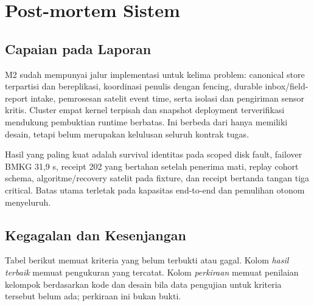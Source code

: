 \chapter{Post-mortem Sistem}
\section{Capaian pada Laporan}
M2 sudah mempunyai jalur implementasi untuk kelima problem: canonical store terpartisi dan bereplikasi, koordinasi penulis dengan fencing, durable inbox/field-report intake, pemrosesan satelit event time, serta isolasi dan pengiriman sensor kritis. Cluster empat kernel terpisah dan snapshot deployment terverifikasi mendukung pembuktian runtime berbatas. Ini berbeda dari hanya memiliki desain, tetapi belum merupakan kelulusan seluruh kontrak tugas.

Hasil yang paling kuat adalah survival identitas pada scoped disk fault, failover BMKG 31,9 s, receipt 202 yang bertahan setelah penerima mati, replay cohort schema, algoritme/recovery satelit pada fixture, dan receipt bertanda tangan tiga critical. Batas utama terletak pada kapasitas end-to-end dan pemulihan otonom menyeluruh.

\section{Kegagalan dan Kesenjangan}
Tabel berikut memuat kriteria yang belum terbukti atau gagal. Kolom \emph{hasil terbaik} memuat pengukuran yang tercatat. Kolom \emph{perkiraan} memuat penilaian kelompok berdasarkan kode dan desain bila data pengujian untuk kriteria tersebut belum ada; perkiraan ini bukan bukti.

